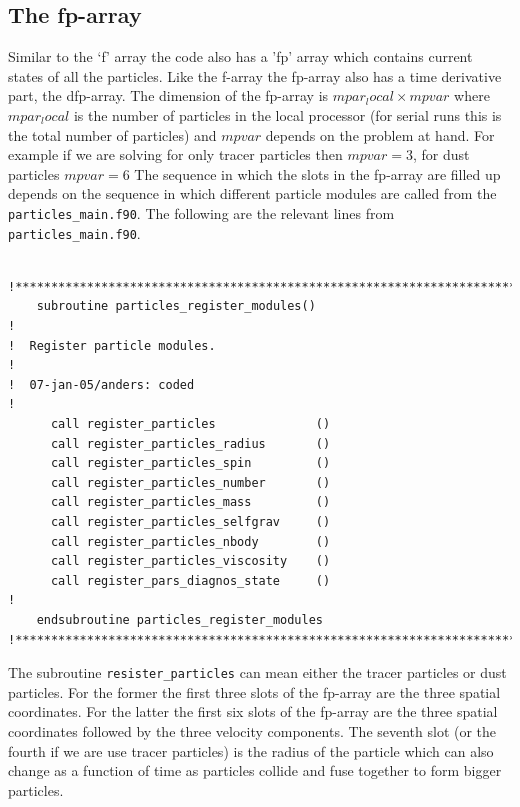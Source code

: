\documentclass[\mydriver,12pt,twoside,notitlepage,a4paper]{article}
\newcommand{\code}[1]{\texttt{#1}}
\begin{document}
%
\subsection{The fp-array}
\label{fp-array}

Similar to the `f' array the code also has a 'fp' array which contains current
states of all the particles. Like the f-array the fp-array also has a time
derivative part, the dfp-array. The dimension of the fp-array is
$mpar_local\times mpvar$ where $mpar_local$ is the number of particles in the
local processor (for serial runs this is the total number of particles) and
$mpvar$ depends on the problem at hand. For example if we are solving for only
tracer particles then $mpvar=3$, for dust particles $mpvar=6$  The sequence in
which the slots in the fp-array are filled up depends on the sequence in which
different particle modules are called from the \code{particles_main.f90}. The
following are the relevant lines from \code{particles_main.f90}.
\begin{verbatim}

!***********************************************************************
    subroutine particles_register_modules()
!
!  Register particle modules.
!
!  07-jan-05/anders: coded
!
      call register_particles              ()
      call register_particles_radius       ()
      call register_particles_spin         ()
      call register_particles_number       ()
      call register_particles_mass         ()
      call register_particles_selfgrav     ()
      call register_particles_nbody        ()
      call register_particles_viscosity    ()
      call register_pars_diagnos_state     ()
!
    endsubroutine particles_register_modules
!***********************************************************************
\end{verbatim}

The subroutine \code{resister_particles} can mean either the tracer particles
or dust particles. For the former the first three slots of the fp-array are the
three spatial coordinates. For the latter the first six slots of the fp-array
are the three spatial coordinates followed by the three velocity components.
The seventh slot (or the fourth if we are use tracer particles) is the radius
of the particle which can also change as a function of time as particles
collide and fuse together to form bigger particles.
\end{document}
